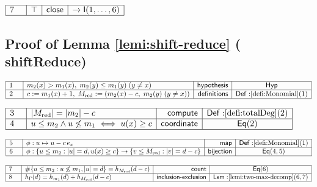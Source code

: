 \documentclass[11pt,reqno]{amsart}
\begin{document}
\nointerlineskip\noindent$%
\begin{array}{|m{0.5cm}|l|r|c|}
\hline
7 & \top & \mathsf{close} & \to\mathsf{I}(1,\dots,6) \\ \hline
\end{array}%
$

\medskip


\subsection*{Proof of Lemma \protect\ref{lemi:shift-reduce} (\textsf{%
shiftReduce})}

\noindent$%
\begin{array}{|m{0.5cm}|l|r|c|}
\hline
1 & m_{2}(x)>m_{1}(x),\;m_{2}(y)\le m_{1}(y)\;(y\ne x) & \mathsf{hypothesis}
& \mathsf{Hyp} \\ \hline
2 & c:=m_{1}(x)+1,\;M_{\mathrm{red}}:=(m_{2}(x)-c,\;m_{2}(y)\;(y\ne x)) & 
\mathsf{definitions} & \mathsf{Def:}\ref{defi:Monomial}(1) \\ \hline
\end{array}%
$

\nointerlineskip\noindent$%
\begin{array}{|m{0.5cm}|l|r|c|}
\hline
3 & |M_{\mathrm{red}}|=|m_{2}|-c & \mathsf{compute} & \mathsf{Def:}\ref%
{defi:totalDeg}(2) \\ \hline
4 & u\le m_{2}\wedge u\not\le m_{1}\iff u(x)\ge c & \mathsf{coordinate} & 
\mathsf{Eq}(2) \\ \hline
\end{array}%
$

\nointerlineskip\noindent$%
\begin{array}{|m{0.5cm}|l|r|c|}
\hline
5 & \phi:u\mapsto u-c\,e_{x} & \mathsf{map} & \mathsf{Def:}\ref%
{defi:Monomial}(1) \\ \hline
6 & \phi:\{u\le m_{2}:|u|=d,u(x)\ge c\}\to\{v\le M_{\mathrm{red}}:|v|=d-c\}
& \mathsf{bijection} & \mathsf{Eq}(4,5) \\ \hline
\end{array}%
$

\nointerlineskip\noindent$%
\begin{array}{|m{0.5cm}|l|r|c|}
\hline
7 & \#\{u\le m_{2}:u\not\le m_{1},|u|=d\}=h_{M_{\mathrm{red}}}(d-c) & 
\mathsf{count} & \mathsf{Eq}(6) \\ \hline
8 & h_{\Gamma}(d)=h_{m_{1}}(d)+h_{M_{\mathrm{red}}}(d-c) & \mathsf{inclusion%
\text{-}exclusion} & \mathsf{Lem:}\ref{lemi:two-max-decomp}(6,7) \\ \hline
\end{array}%
$
\end{document}
